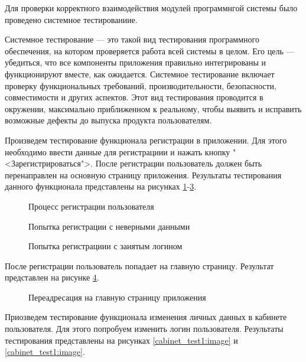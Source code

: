 Для проверки корректного взаимодействия модулей программнгой системы было проведено системное тестированиие. 

Системное тестирование — это такой вид тестирования программного обеспечения, на котором проверяется работа всей системы в целом. Его цель — убедиться, что все компоненты приложения правильно интегрированы и функционируют вместе, как ожидается. Системное тестирование включает проверку функциональных требований, производительности, безопасности, совместимости и других аспектов. Этот вид тестирования проводится в окружении, максимально приближенном к реальному, чтобы выявить и исправить возможные дефекты до выпуска продукта пользователям.

Произведем тестирование функционала регистрации в приложении. Для этого необходимо ввести данные для регистрациии и нажать кнопку "<Зарегистрироваться">. После регистрации пользователь должен быть перенаправлен на основную страницу приложения. Результаты тестирования данного функционала представлены на рисунках \ref{signup_test1:image}-\ref{signup_test3:image}. 

\begin{figure}[H]
	\caption{Процесс регистрации пользователя}
	\label{signup_test1:image}
\end{figure}

\begin{figure}[H]
	\caption{Попытка регистрации с неверными данными}
	\label{signup_test2:image}
\end{figure}

\begin{figure}[H]
	\caption{Попытка регистрациии с занятым логином}
	\label{signup_test3:image}
\end{figure}

После регистрации пользователь попадает на главную страницу. Результат представлен на рисунке \ref{signup_test4:image}.

\begin{figure}[H]
	\caption{Переадресация на главную страницу приложения}
	\label{signup_test4:image}
\end{figure}

Приозведем тестирование функционала изменения личных данных в кабинете пользователя. Для этого попробуем изменить логин пользователя. Результаты тестирования представлены на рисунках \ref{cabinet_test1:image} и \ref{cabinet_test1:image}.



